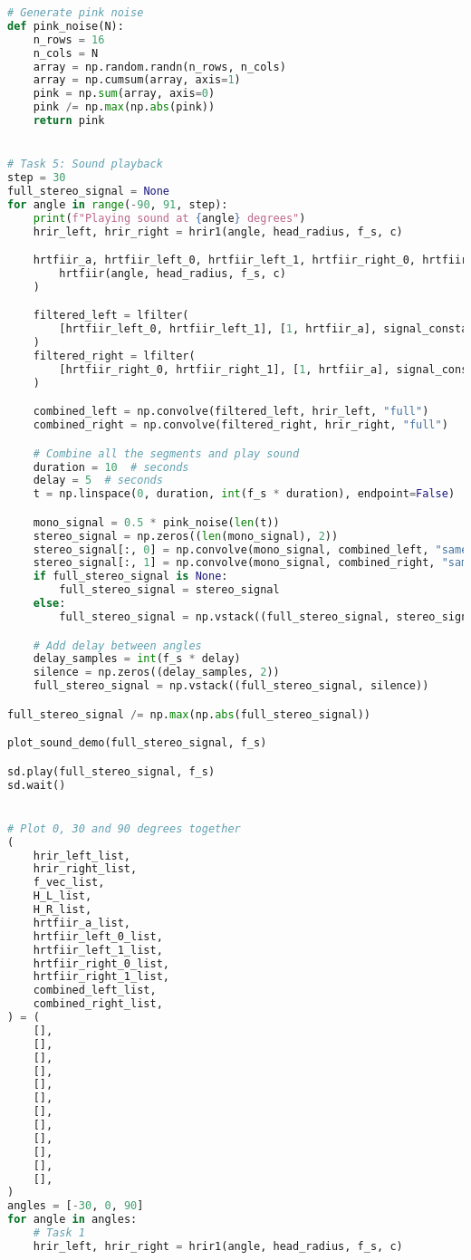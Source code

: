 \begin{lstlisting}[language=Python, caption={main.py}, label={lst:main.py}]
# Generate pink noise
def pink_noise(N):
    n_rows = 16
    n_cols = N
    array = np.random.randn(n_rows, n_cols)
    array = np.cumsum(array, axis=1)
    pink = np.sum(array, axis=0)
    pink /= np.max(np.abs(pink))
    return pink


# Task 5: Sound playback
step = 30
full_stereo_signal = None
for angle in range(-90, 91, step):
    print(f"Playing sound at {angle} degrees")
    hrir_left, hrir_right = hrir1(angle, head_radius, f_s, c)

    hrtfiir_a, hrtfiir_left_0, hrtfiir_left_1, hrtfiir_right_0, hrtfiir_right_1 = (
        hrtfiir(angle, head_radius, f_s, c)
    )

    filtered_left = lfilter(
        [hrtfiir_left_0, hrtfiir_left_1], [1, hrtfiir_a], signal_constant
    )
    filtered_right = lfilter(
        [hrtfiir_right_0, hrtfiir_right_1], [1, hrtfiir_a], signal_constant
    )

    combined_left = np.convolve(filtered_left, hrir_left, "full")
    combined_right = np.convolve(filtered_right, hrir_right, "full")

    # Combine all the segments and play sound
    duration = 10  # seconds
    delay = 5  # seconds
    t = np.linspace(0, duration, int(f_s * duration), endpoint=False)

    mono_signal = 0.5 * pink_noise(len(t))
    stereo_signal = np.zeros((len(mono_signal), 2))
    stereo_signal[:, 0] = np.convolve(mono_signal, combined_left, "same")
    stereo_signal[:, 1] = np.convolve(mono_signal, combined_right, "same")
    if full_stereo_signal is None:
        full_stereo_signal = stereo_signal
    else:
        full_stereo_signal = np.vstack((full_stereo_signal, stereo_signal))

    # Add delay between angles
    delay_samples = int(f_s * delay)
    silence = np.zeros((delay_samples, 2))
    full_stereo_signal = np.vstack((full_stereo_signal, silence))

full_stereo_signal /= np.max(np.abs(full_stereo_signal))

plot_sound_demo(full_stereo_signal, f_s)

sd.play(full_stereo_signal, f_s)
sd.wait()


# Plot 0, 30 and 90 degrees together
(
    hrir_left_list,
    hrir_right_list,
    f_vec_list,
    H_L_list,
    H_R_list,
    hrtfiir_a_list,
    hrtfiir_left_0_list,
    hrtfiir_left_1_list,
    hrtfiir_right_0_list,
    hrtfiir_right_1_list,
    combined_left_list,
    combined_right_list,
) = (
    [],
    [],
    [],
    [],
    [],
    [],
    [],
    [],
    [],
    [],
    [],
    [],
)
angles = [-30, 0, 90]
for angle in angles:
    # Task 1
    hrir_left, hrir_right = hrir1(angle, head_radius, f_s, c)


\end{lstlisting}
